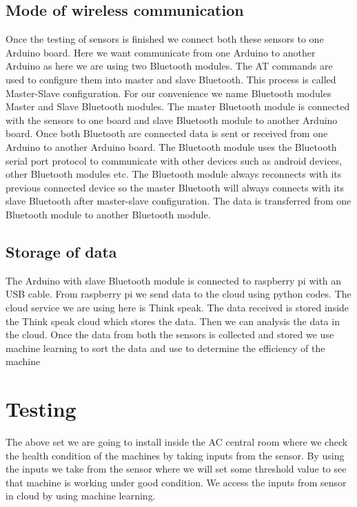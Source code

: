\subsection{Mode of wireless communication}
Once the testing of sensors is finished we connect both these sensors to one Arduino board. Here we want communicate from one Arduino to another Arduino as here we are using two Bluetooth modules. The AT commands are used to configure them into master and slave Bluetooth. This process is called Master-Slave configuration. For our convenience we name Bluetooth modules Master and Slave Bluetooth modules. The master Bluetooth module is connected with the sensors to one board and slave Bluetooth module to another Arduino board. Once both Bluetooth are connected data is sent or received from one Arduino to another Arduino board.
The Bluetooth module uses the Bluetooth serial port protocol to communicate with other devices such as android devices, other Bluetooth modules etc. The Bluetooth module always reconnects with its previous connected device so the master Bluetooth will always connects with its slave Bluetooth after master-slave configuration. The data is transferred from one Bluetooth module to another Bluetooth module.
\subsection{Storage of data }
The Arduino with slave Bluetooth module is connected to raspberry pi with an USB cable. From raspberry pi we send data to the cloud using python codes. The cloud service we are using here is Think speak. The data received is stored inside the Think speak cloud which stores the data. Then we can analysis the data in the cloud. Once the data from both the sensors is collected and stored we use machine learning to sort the data and use to determine the efficiency of the machine
\section{Testing}
The above set we are going to install inside the AC central room where we check the health condition of the machines by taking inputs from the sensor. By using the inputs we take from the sensor where we will set some threshold value to see that machine is working under good condition. We access the inputs from sensor in cloud by using machine learning.






